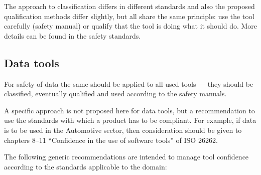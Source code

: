 The approach to classification differs in different standards and also the proposed qualification methods differ slightly,
but all share the same principle: use the tool carefully (safety manual) or qualify that the tool is doing what it should do.
More details can be found in the safety standards.

\subsection{Data tools}
 
For safety of data the same should be applied to all used tools --- they should be classified, eventually qualified and used according to the safety manuals.
 
A specific approach is not proposed here for data tools,
but a recommendation to use the standards with which a product has to be compliant.
For example, if data is to be used in the Automotive sector,
then consideration should be given to chapters 8--11 ``Confidence in the use of  software tools'' of ISO 26262.
 
The following generic recommendations are intended to manage tool confidence according to the standards applicable to the domain:

